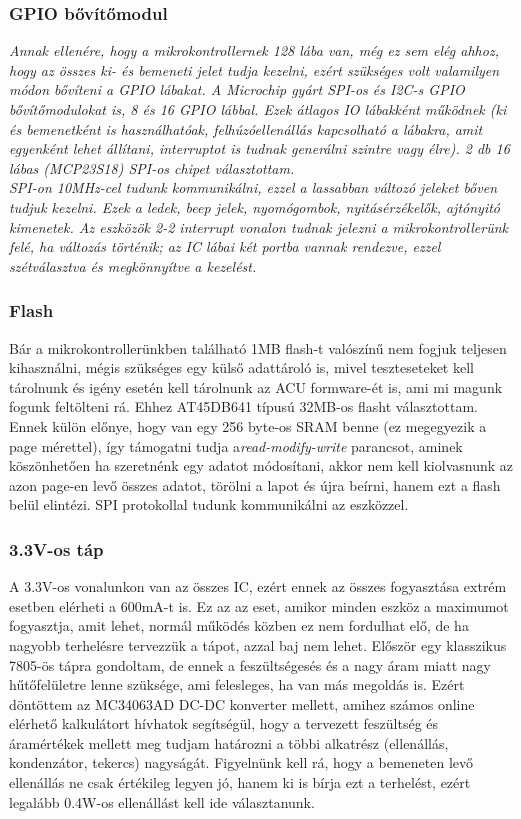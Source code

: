 \documentclass[a4paper, 12pt]{article}
\newcommand{\tab}{\hspace*{1em}}
\begin{document}
\subsubsection{GPIO bővítőmodul}
\emph{
\tab Annak ellenére, hogy a mikrokontrollernek 128 lába van, még ez sem elég ahhoz, hogy az összes ki- és bemeneti jelet tudja kezelni, ezért szükséges volt valamilyen módon bővíteni a GPIO lábakat. A Microchip\textregistered{} gyárt SPI-os és I2C-s GPIO bővítőmodulokat is, 8 és 16 GPIO lábbal. Ezek átlagos IO lábakként működnek (ki és bemenetként is használhatóak, felhúzóellenállás kapcsolható a lábakra, amit egyenként lehet állítani, interruptot is tudnak generálni szintre vagy élre). 2 db 16 lábas (MCP23S18) \cite{mcp23s18} SPI-os chipet választottam.\\
SPI-on 10MHz-cel tudunk kommunikálni, ezzel a lassabban változó jeleket bőven tudjuk kezelni. Ezek a ledek, beep jelek, nyomógombok, nyitásérzékelők, ajtónyitó kimenetek. Az eszközök 2-2 interrupt vonalon tudnak jelezni a mikrokontrollerünk felé, ha változás történik; az IC lábai két portba vannak rendezve, ezzel szétválasztva és megkönnyítve a kezelést.}


\subsubsection{Flash}
\tab Bár a mikrokontrollerünkben található 1MB flash-t valószínű nem fogjuk teljesen kihasználni, mégis szükséges egy külső adattároló is, mivel teszteseteket kell tárolnunk és igény esetén kell tárolnunk az ACU formware-ét is, ami mi magunk fogunk feltölteni rá. Ehhez AT45DB641 \cite{flash} típusú 32MB-os flasht választottam. Ennek külön előnye, hogy van egy 256 byte-os SRAM benne (ez megegyezik a page mérettel), így támogatni tudja a\emph{read-modify-write} parancsot, aminek köszönhetően ha szeretnénk egy adatot módosítani, akkor nem kell kiolvasnunk az azon page-en levő összes adatot, törölni a lapot és újra beírni, hanem ezt a flash belül elintézi. SPI protokollal tudunk kommunikálni az eszközzel.

\subsubsection{3.3V-os táp}
\tab A 3.3V-os vonalunkon van az összes IC, ezért ennek az összes fogyasztása extrém esetben elérheti a 600mA-t is. Ez az az eset, amikor minden eszköz a maximumot fogyasztja, amit lehet, normál működés közben ez nem fordulhat elő, de ha nagyobb terhelésre tervezzük a tápot, azzal baj nem lehet. Először egy klasszikus 7805-ös tápra gondoltam, de ennek a feszültségesés és a nagy áram miatt nagy hűtőfelületre lenne szüksége, ami felesleges, ha van más megoldás is. Ezért döntöttem az MC34063AD \cite{dcdc} DC-DC konverter mellett, amihez számos online elérhető kalkulátort hívhatok segítségül, hogy a tervezett feszültség és áramértékek mellett meg tudjam határozni a többi alkatrész (ellenállás, kondenzátor, tekercs) nagyságát.
Figyelnünk kell rá, hogy a bemeneten levő ellenállás ne csak értékileg legyen jó, hanem ki is bírja ezt a terhelést, ezért legalább 0.4W-os ellenállást kell ide választanunk.
\end{document}
